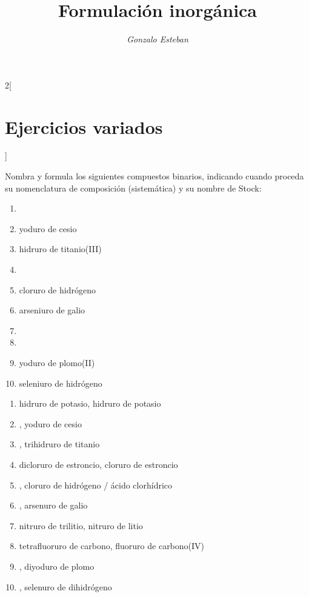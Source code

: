 \documentclass[10pt]{article}
\title{Formulación inorgánica}
\author{\textit{Gonzalo Esteban}}
\begin{document}
\maketitle

\begin{multicols*}{2}[
  \section{Ejercicios variados}
  ]

\begin{exercise}[
    tags    = {inorgánica,compuestos binarios,sales binarias,sales,hidruros},
    topics  = {química inorgánica,formulación,nomenclatura},
    source  = {SAN Formulación, p26, e28},
  ]
  Nombra y formula los siguientes compuestos binarios, indicando cuando proceda su nomenclatura de composición (sistemática) y su nombre de Stock:

  \begin{enumerate}
    \item {}
    \item yoduro de cesio
    \item hidruro de titanio(III)
    \item {}
    \item cloruro de hidrógeno
    \item arseniuro de galio
    \item {}
    \item {}
    \item yoduro de plomo(II)
    \item seleniuro de hidrógeno
  \end{enumerate}
\end{exercise}

\begin{solution}
  \begin{enumerate}
    \item hidruro de potasio, hidruro de potasio
    \item {}, yoduro de cesio
    \item {}, trihidruro de titanio
    \item dicloruro de estroncio, cloruro de estroncio
    \item {}, cloruro de hidrógeno / ácido clorhídrico
    \item {}, arsenuro de galio
    \item nitruro de trilitio, nitruro de litio
    \item tetrafluoruro de carbono, fluoruro de carbono(IV)
    \item {}, diyoduro de plomo
    \item {}, selenuro de dihidrógeno
  \end{enumerate}
\end{solution}




\end{multicols*}
\end{document}
